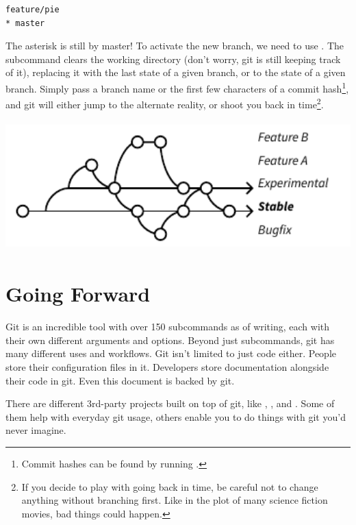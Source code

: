 \documentclass[11pt,letterpaper,twoside]{report}
\begin{document}
\begin{lstlisting}[numbers=none]
  feature/pie
* master
\end{lstlisting}

The asterisk is still by master! To activate the new branch, we need to use
. The subcommand clears the working directory (don't worry,
git is still keeping track of it), replacing it with the last state of a given
branch, or to the state of a given branch. Simply pass  a
branch name or the first few characters of a commit hash\footnote{Commit hashes
can be found by running .}, and git will either jump to the
alternate reality, or shoot you back in time\footnote{If you decide to play with
going back in time, be careful not to change anything without branching first.
Like in the plot of many science fiction movies, bad things could happen.}.

\vspace{\fill}
\begin{center}
\includegraphics[height=5cm]{resources/example_branching.pdf}
\end{center}
\vspace*{\fill}

\chapter{Going Forward}

Git is an incredible tool with over 150 subcommands as of writing, each with
their own different arguments and options. Beyond just subcommands, git has many
different uses and workflows. Git isn't limited to just code either. People
store their configuration files in it. Developers store documentation alongside
their code in git. Even this document is backed by git.

There are different 3rd-party projects built on top of git, like
, , and . Some of them help
with everyday git usage, others enable you to do things with git you'd never
imagine.
\end{document}
